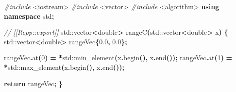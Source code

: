 \documentclass[
]{book}
\newenvironment{Shaded}{\begin{snugshade}}{\end{snugshade}}
\newcommand{\BuiltInTok}[1]{#1}
\newcommand{\CommentTok}[1]{\textcolor[rgb]{0.56,0.35,0.01}{\textit{#1}}}
\newcommand{\ControlFlowTok}[1]{\textcolor[rgb]{0.13,0.29,0.53}{\textbf{#1}}}
\newcommand{\DataTypeTok}[1]{\textcolor[rgb]{0.13,0.29,0.53}{#1}}
\newcommand{\DecValTok}[1]{\textcolor[rgb]{0.00,0.00,0.81}{#1}}
\newcommand{\FloatTok}[1]{\textcolor[rgb]{0.00,0.00,0.81}{#1}}
\newcommand{\ImportTok}[1]{#1}
\newcommand{\KeywordTok}[1]{\textcolor[rgb]{0.13,0.29,0.53}{\textbf{#1}}}
\newcommand{\NormalTok}[1]{#1}
\newcommand{\OperatorTok}[1]{\textcolor[rgb]{0.81,0.36,0.00}{\textbf{#1}}}
\newcommand{\PreprocessorTok}[1]{\textcolor[rgb]{0.56,0.35,0.01}{\textit{#1}}}
\begin{document}
\begin{Shaded}
\begin{Highlighting}[]
\PreprocessorTok{\#include }\ImportTok{\textless{}iostream\textgreater{}}
\PreprocessorTok{\#include }\ImportTok{\textless{}vector\textgreater{}}
\PreprocessorTok{\#include }\ImportTok{\textless{}algorithm\textgreater{}}
\KeywordTok{using} \KeywordTok{namespace}\NormalTok{ std}\OperatorTok{;}

\CommentTok{// [[Rcpp::export]]}
\BuiltInTok{std::}\NormalTok{vector}\OperatorTok{\textless{}}\DataTypeTok{double}\OperatorTok{\textgreater{}}\NormalTok{ rangeC}\OperatorTok{(}\BuiltInTok{std::}\NormalTok{vector}\OperatorTok{\textless{}}\DataTypeTok{double}\OperatorTok{\textgreater{}}\NormalTok{ x}\OperatorTok{)}
\OperatorTok{\{}
    \BuiltInTok{std::}\NormalTok{vector}\OperatorTok{\textless{}}\DataTypeTok{double}\OperatorTok{\textgreater{}}\NormalTok{ rangeVec}\OperatorTok{\{}\FloatTok{0.0}\OperatorTok{,} \FloatTok{0.0}\OperatorTok{\};}

\NormalTok{    rangeVec}\OperatorTok{.}\NormalTok{at}\OperatorTok{(}\DecValTok{0}\OperatorTok{)} \OperatorTok{=} \OperatorTok{*}\BuiltInTok{std::}\NormalTok{min\_element}\OperatorTok{(}\NormalTok{x}\OperatorTok{.}\NormalTok{begin}\OperatorTok{(),}\NormalTok{ x}\OperatorTok{.}\NormalTok{end}\OperatorTok{());}
\NormalTok{    rangeVec}\OperatorTok{.}\NormalTok{at}\OperatorTok{(}\DecValTok{1}\OperatorTok{)} \OperatorTok{=} \OperatorTok{*}\BuiltInTok{std::}\NormalTok{max\_element}\OperatorTok{(}\NormalTok{x}\OperatorTok{.}\NormalTok{begin}\OperatorTok{(),}\NormalTok{ x}\OperatorTok{.}\NormalTok{end}\OperatorTok{());}

    \ControlFlowTok{return}\NormalTok{ rangeVec}\OperatorTok{;}
\OperatorTok{\}}
\end{Highlighting}
\end{Shaded}
\end{document}
